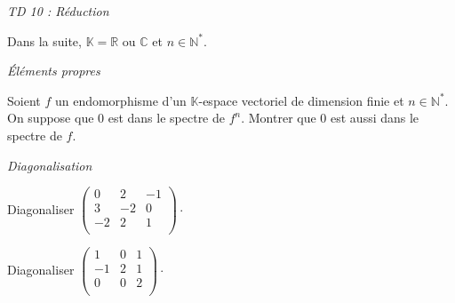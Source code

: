 \documentclass[a4paper,10pt]{report}
\begin{document}
\everymath{\displaystyle}
\begin{center}
\textit{{ {\huge TD 10 : Réduction}}}
\end{center}

\bigskip


\noindent Dans la suite, $\mathbb{K} = \mathbb{R}$ ou $\mathbb{C}$ et $n \in \mathbb{N}^*$.

\medskip

\begin{center}
\textit{{ {\large Éléments propres}}}
\end{center}

\medskip

\begin{Exercice}{] Soient $E = \mathbb{R}[X}$ et $\varphi \in \mathcal{L}(E)$ défini par $\varphi(P)=XP'$. Déterminer les éléments propres de $\varphi$.
\end{Exercice}



\begin{Exercice}{} Soient $f$ un endomorphisme d'un $\mathbb{K}$-espace vectoriel de dimension finie et $n \in \mathbb{N}^{*}$. On suppose que $0$ est dans le spectre de $f^n$. Montrer que $0$ est aussi dans le spectre de $f$.
\end{Exercice}


\medskip

\begin{center}
\textit{{ {\large Diagonalisation}}}
\end{center}

\medskip

\begin{Exercice}{} Diagonaliser $\begin{pmatrix}
0 & 2 & -1 \\
3 & -2 & 0 \\
-2 & 2 & 1 \\
\end{pmatrix}\cdot$
\end{Exercice}



\begin{Exercice}{} Diagonaliser $\begin{pmatrix}
1 & 0& 1 \\
-1 & 2 & 1 \\
0 & 0 & 2 \\
\end{pmatrix}\cdot$
\end{Exercice}
\end{document}
